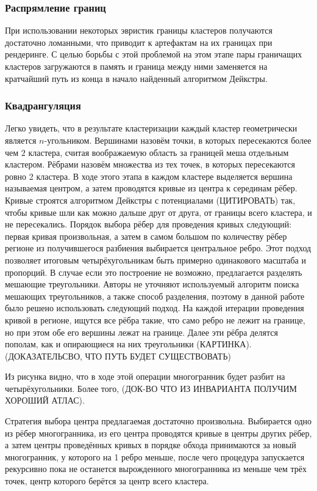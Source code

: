 \documentclass{article}
\begin{document}
\subsubsection{Распрямление границ}
При использовании некоторых эвристик границы кластеров получаются достаточно ломанными, что приводит к артефактам на их границах при рендеринге. С целью борьбы с этой проблемой на этом этапе пары граничащих кластеров загружаются в память и граница между ними заменяется на кратчайший путь из конца в начало найденный алгоритмом Дейкстры.

\subsubsection{Квадрангуляция}
Легко увидеть, что в результате кластеризации каждый кластер геометрически является $n$-угольником. Вершинами назовём точки, в которых пересекаются более чем $2$ кластера, считая воображаемую область за границей меша отдельным кластером. Рёбрами назовём множества из тех точек, в которых пересекаются ровно 2 кластера. В ходе этого этапа в каждом кластере выделяется вершина называемая центром, а затем проводятся кривые из центра к серединам рёбер. Кривые строятся алгоритмом Дейкстры с потенциалами (ЦИТИРОВАТЬ) так, чтобы кривые шли как можно дальше друг от друга, от границы всего кластера, и не пересекались. Порядок выбора рёбер для проведения кривых следующий: первая кривая произвольная, а затем в самом большом по количеству рёбер регионе из получившегося разбиения выбирается центральное ребро. Этот подход позволяет итоговым четырёхугольникам быть примерно одинакового масштаба и пропорций. В случае если это построение не возможно, предлагается разделять мешающие треугольники. Авторы не уточняют используемый алгоритм поиска мешающих треугольников, а также способ разделения, поэтому в данной работе было решено использовать следующий подход. На каждой итерации проведения кривой в регионе, ищутся все рёбра такие, что само ребро не лежит на границе, но при этом обе его вершины лежат на границе. Далее эти рёбра делятся пополам, как и опирающиеся на них треугольники (КАРТИНКА).
(ДОКАЗАТЕЛЬСВО, ЧТО ПУТЬ БУДЕТ СУЩЕСТВОВАТЬ)

Из рисунка видно, что в ходе этой операции многогранник будет разбит на четырёхугольники. Более того, (ДОК-ВО ЧТО ИЗ ИНВАРИАНТА ПОЛУЧИМ ХОРОШИЙ АТЛАС).

Стратегия выбора центра предлагаемая \cite{purnomo2004} достаточно произвольна. Выбирается одно из рёбер многогранника, из его центра проводятся кривые в центры других рёбер, а затем центры проведённых кривых в порядке обхода принимаются за новый многогранник, у которого на 1 ребро меньше, после чего процедура запускается рекурсивно пока не останется вырожденного многогранника из меньше чем трёх точек, центр которого берётся за центр всего кластера.
\end{document}
